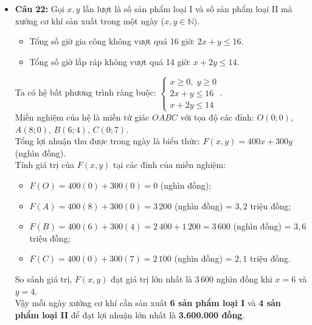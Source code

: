 \documentclass[12pt,a4paper]{article}
\begin{document}
\begin{itemize}[leftmargin=0.6cm, itemsep=2pt, topsep=1pt]
    \item \textbf{Câu 22:}
    Gọi $x, y$ lần lượt là số sản phẩm loại I và số sản phẩm loại II mà xưởng cơ khí sản xuất trong một ngày ($x, y \in \mathbb{N}$).
    \begin{itemize}[itemsep=1pt]
        \item Tổng số giờ gia công không vượt quá 16 giờ: $2x + y \le 16$.
        \item Tổng số giờ lắp ráp không vượt quá 14 giờ: $x + 2y \le 14$.
    \end{itemize}
    Ta có hệ bất phương trình ràng buộc:
    $\begin{cases} x \ge 0,\; y \ge 0 \\ 2x + y \le 16 \\ x + 2y \le 14 \end{cases}$.\\
    Miền nghiệm của hệ là miền tứ giác $OABC$ với tọa độ các đỉnh:
    $O(0; 0)$, $A(8; 0)$, $B(6; 4)$, $C(0; 7)$.\\
    Tổng lợi nhuận thu được trong ngày là biểu thức: $F(x, y) = 400x + 300y$ (nghìn đồng).\\
    Tính giá trị của $F(x, y)$ tại các đỉnh của miền nghiệm:
    \begin{itemize}[itemsep=1pt]
        \item $F(O) = 400(0) + 300(0) = 0$ (nghìn đồng);
        \item $F(A) = 400(8) + 300(0) = 3\,200$ (nghìn đồng) = $3{,}2$ triệu đồng;
        \item $F(B) = 400(6) + 300(4) = 2\,400 + 1\,200 = 3\,600$ (nghìn đồng) = $3{,}6$ triệu đồng;
        \item $F(C) = 400(0) + 300(7) = 2\,100$ (nghìn đồng) = $2{,}1$ triệu đồng.
    \end{itemize}
    So sánh giá trị, $F(x, y)$ đạt giá trị lớn nhất là $3\,600$ nghìn đồng khi $x = 6$ và $y = 4$.\\
    Vậy mỗi ngày xưởng cơ khí cần sản xuất \textbf{6 sản phẩm loại I} và \textbf{4 sản phẩm loại II} để đạt lợi nhuận lớn nhất là \textbf{3.600.000 đồng}.
\end{itemize}
\end{document}
